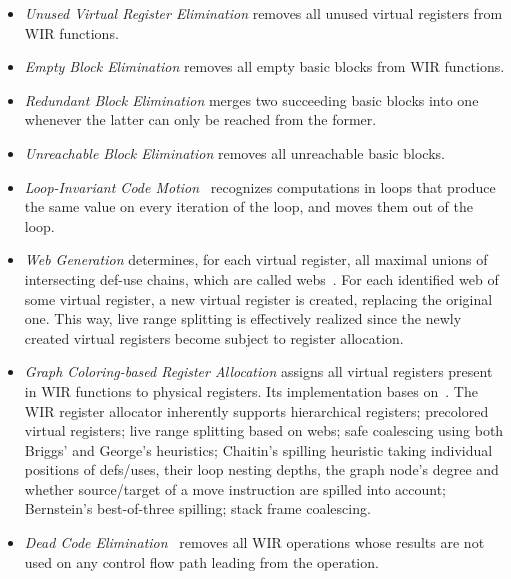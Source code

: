 \begin{itemize}
  \item \textit{Unused Virtual Register Elimination} removes all unused virtual registers from \gls{WIR} functions.

  \item \textit{Empty Block Elimination} removes all empty basic blocks from \gls{WIR} functions.

  \item \textit{Redundant Block Elimination} merges two succeeding basic blocks into one whenever the latter can only be reached from the former.

  \item \textit{Unreachable Block Elimination} removes all unreachable basic blocks.

  \item \textit{Loop-Invariant Code Motion}~\cite[chapter~13.2]{Much97} recognizes computations in loops that produce the same value on every iteration of the loop, and moves them out of the loop.

  \item \textit{Web Generation} determines, for each virtual register, all maximal unions of intersecting def-use chains, which are called webs~\cite[chapter~8.10]{Much97}.
  For each identified web of some virtual register, a new virtual register is created, replacing the original one.
  This way, live range splitting is effectively realized since the newly created virtual registers become subject to register allocation.

  \item \textit{Graph Coloring-based Register Allocation} assigns all virtual registers present in \gls{WIR} functions to physical registers.
  Its implementation bases on~\cite[chapter~16.3]{Much97}\cite[chapter~11]{Appel04}\cite{Brig92,BGM+89,Chai82}.
  The \gls{WIR} register allocator inherently supports hierarchical registers; precolored virtual registers; live range splitting based on webs; safe coalescing using both Briggs' and George's heuristics; Chaitin's spilling heuristic taking individual positions of defs/uses, their loop nesting depths, the graph node's degree and whether source/target of a move instruction are spilled into account; Bernstein's best-of-three spilling; stack frame coalescing.

  \item \textit{Dead Code Elimination}~\cite[chapter~17.3]{Appel04}\cite[chapter~18.10]{Much97} removes all \gls{WIR} operations whose results are not used on any control flow path leading from the operation.


\end{itemize}
